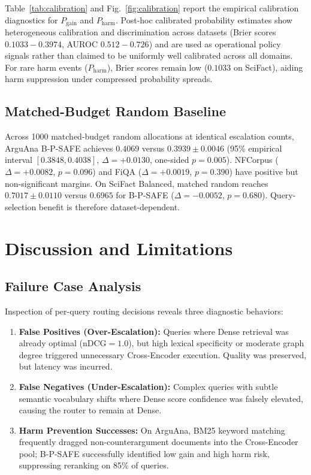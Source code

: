 \documentclass[10pt,journal]{IEEEtran}
\newcommand{\bpsafe}{B-P-SAFE}
\begin{document}
Table~\ref{tab:calibration} and Fig.~\ref{fig:calibration} report the empirical calibration diagnostics for $P_{\mathrm{gain}}$ and $P_{\mathrm{harm}}$. Post-hoc calibrated probability estimates show heterogeneous calibration and discrimination across datasets (Brier scores $0.1033 - 0.3974$, AUROC $0.512 - 0.726$) and are used as operational policy signals rather than claimed to be uniformly well calibrated across all domains. For rare harm events ($P_{\mathrm{harm}}$), Brier scores remain low ($0.1033$ on SciFact), aiding harm suppression under compressed probability spreads.

\subsection{Matched-Budget Random Baseline}

Across 1000 matched-budget random allocations at identical escalation counts, ArguAna \bpsafe{} achieves $0.4069$ versus $0.3939 \pm 0.0046$ (95\% empirical interval $[0.3848, 0.4038]$, $\Delta = +0.0130$, one-sided $p=0.005$). NFCorpus ($\Delta = +0.0082$, $p=0.096$) and FiQA ($\Delta = +0.0019$, $p=0.390$) have positive but non-significant margins. On SciFact Balanced, matched random reaches $0.7017 \pm 0.0110$ versus $0.6965$ for \bpsafe{} ($\Delta = -0.0052$, $p=0.680$). Query-selection benefit is therefore dataset-dependent.

\section{Discussion and Limitations}
\label{sec:discussion}

\subsection{Failure Case Analysis}
Inspection of per-query routing decisions reveals three diagnostic behaviors:
\begin{enumerate}
    \item \textbf{False Positives (Over-Escalation):} Queries where Dense retrieval was already optimal ($\text{nDCG}=1.0$), but high lexical specificity or moderate graph degree triggered unnecessary Cross-Encoder execution. Quality was preserved, but latency was incurred.
    \item \textbf{False Negatives (Under-Escalation):} Complex queries with subtle semantic vocabulary shifts where Dense score confidence was falsely elevated, causing the router to remain at Dense.
    \item \textbf{Harm Prevention Successes:} On ArguAna, BM25 keyword matching frequently dragged non-counterargument documents into the Cross-Encoder pool; \bpsafe{} successfully identified low gain and high harm risk, suppressing reranking on 85\% of queries.
\end{enumerate}
\end{document}
